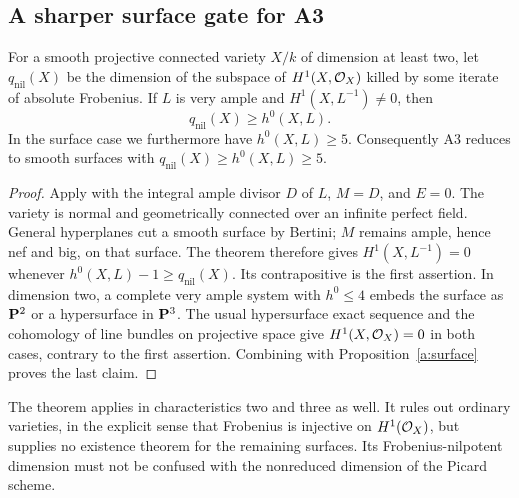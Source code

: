 \subsection{A sharper surface gate for A3}
\begin{proposition}
\label{a:nilpotence}
For a smooth projective connected variety $X/k$ of dimension at least two,
let $q_{\mathrm{nil}}(X)$ be the dimension of the subspace of
$H^1(X,\mathcal O_X)$ killed by some iterate of absolute Frobenius.
If $L$ is very ample and $H^1(X,L^{-1})\ne0$, then
\[
 q_{\mathrm{nil}}(X)\geq h^0(X,L).
\]
In the surface case we furthermore have $h^0(X,L)\geq5$.
Consequently A3 reduces to smooth surfaces with
$q_{\mathrm{nil}}(X)\geq h^0(X,L)\geq5$.
\end{proposition}
\begin{proof}
Apply \cite[Theorem 4.20, pp.~15--16]{Enokizono2021} with the
integral ample divisor $D$ of $L$, $M=D$, and $E=0$.
The variety is normal and geometrically connected over an infinite
perfect field. General hyperplanes cut a smooth surface by Bertini;
$M$ remains ample, hence nef and big, on that surface. The theorem
therefore gives $H^1(X,L^{-1})=0$ whenever
$h^0(X,L)-1\geq q_{\mathrm{nil}}(X)$. Its contrapositive is the
first assertion. In dimension two, a complete very ample system
with $h^0\leq4$ embeds the surface as $\mathbf P^2$ or a hypersurface
in $\mathbf P^3$. The usual hypersurface exact sequence and the
cohomology of line bundles on projective space give
$H^1(X,\mathcal O_X)=0$ in both cases, contrary to the first assertion.
Combining with Proposition~\ref{a:surface} proves the last claim.
\end{proof}
The theorem applies in characteristics two and three as well.
It rules out ordinary varieties, in the explicit sense that Frobenius
is injective on $H^1(\mathcal O_X)$, but supplies no existence theorem for
the remaining surfaces. Its Frobenius-nilpotent dimension must not
be confused with the nonreduced dimension of the Picard scheme.

